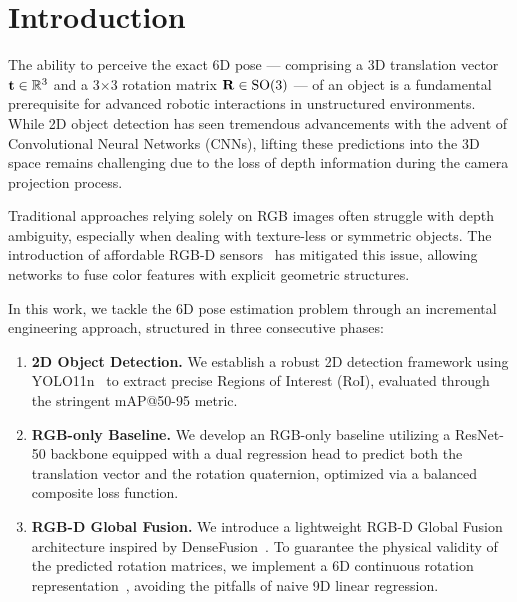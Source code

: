 \section{Introduction}
\label{sec:intro}

The ability to perceive the exact 6D pose — comprising a 3D translation vector $\mathbf{t} \in \mathbb{R}^3$ and a 3$\times$3 rotation matrix $\mathbf{R} \in \mathrm{SO}(3)$ — of an object is a fundamental prerequisite for advanced robotic interactions in unstructured environments. While 2D object detection has seen tremendous advancements with the advent of Convolutional Neural Networks (CNNs), lifting these predictions into the 3D space remains challenging due to the loss of depth information during the camera projection process.

Traditional approaches relying solely on RGB images often struggle with depth ambiguity, especially when dealing with texture-less or symmetric objects. The introduction of affordable RGB-D sensors~\cite{hinterstoisser2012model} has mitigated this issue, allowing networks to fuse color features with explicit geometric structures.

In this work, we tackle the 6D pose estimation problem through an incremental engineering approach, structured in three consecutive phases:

\begin{enumerate}
    \item \textbf{2D Object Detection.} We establish a robust 2D detection framework using YOLO11n~\cite{ultralytics2024yolo11} to extract precise Regions of Interest (RoI), evaluated through the stringent mAP@50-95 metric.
    
    \item \textbf{RGB-only Baseline.} We develop an RGB-only baseline utilizing a ResNet-50 backbone equipped with a dual regression head to predict both the translation vector and the rotation quaternion, optimized via a balanced composite loss function.
    
    \item \textbf{RGB-D Global Fusion.} We introduce a lightweight RGB-D Global Fusion architecture inspired by DenseFusion~\cite{wang2019densefusion}. To guarantee the physical validity of the predicted rotation matrices, we implement a 6D continuous rotation representation~\cite{zhou2019continuity}, avoiding the pitfalls of naive 9D linear regression.
\end{enumerate}

